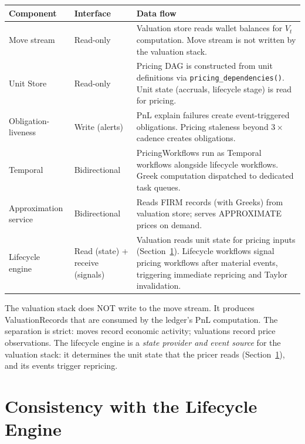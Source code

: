 \documentclass[11pt,a4paper]{article}
\begin{document}
\begin{center}
\small
\begin{tabular}{l p{4cm} p{6.5cm}}
\toprule
\textbf{Component} & \textbf{Interface} & \textbf{Data flow} \\
\midrule
Move stream~\cite[\S8]{ledger} & Read-only & Valuation store reads wallet balances for $V_t$ computation. Move stream is not written by the valuation stack. \\
Unit Store~\cite[\S3]{ledger} & Read-only & Pricing DAG is constructed from unit definitions via \texttt{pricing\_dependencies()}. Unit state (accruals, lifecycle stage) is read for pricing. \\
Obligation-liveness~\cite[\S14.7]{ledger} & Write (alerts) & PnL explain failures create event-triggered obligations. Pricing staleness beyond $3\times$ cadence creates obligations. \\
Temporal~\cite[\S14]{ledger} & Bidirectional & PricingWorkflows run as Temporal workflows alongside lifecycle workflows. Greek computation dispatched to dedicated task queues. \\
Approximation service & Bidirectional & Reads FIRM records (with Greeks) from valuation store; serves APPROXIMATE prices on demand. \\
Lifecycle engine~\cite[\S7]{ledger} & Read (state) + receive (signals) & Valuation reads unit state for pricing inputs (Section~\ref{sec:lifecycle-consistency}).  Lifecycle workflows signal pricing workflows after material events, triggering immediate repricing and Taylor invalidation. \\
\bottomrule
\end{tabular}
\end{center}

\noindent The valuation stack does NOT write to the move stream.  It produces ValuationRecords that are consumed by the ledger's PnL computation.  The separation is strict: moves record economic activity; valuations record price observations.  The lifecycle engine is a \emph{state provider and event source} for the valuation stack: it determines the unit state that the pricer reads (Section~\ref{sec:lifecycle-consistency}), and its events trigger repricing.

\clearpage
\section{Consistency with the Lifecycle Engine}
\label{sec:lifecycle-consistency}
\end{document}
